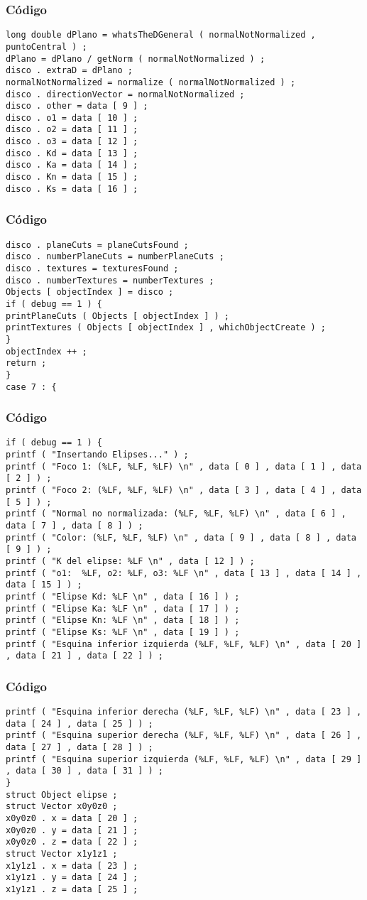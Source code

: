 \documentclass{beamer}
\begin{document}
\begin{frame}[fragile]
\frametitle{C\'odigo}
\begin{verbatim}
long double dPlano = whatsTheDGeneral ( normalNotNormalized , puntoCentral ) ; 
dPlano = dPlano / getNorm ( normalNotNormalized ) ; 
disco . extraD = dPlano ; 
normalNotNormalized = normalize ( normalNotNormalized ) ; 
disco . directionVector = normalNotNormalized ; 
disco . other = data [ 9 ] ; 
disco . o1 = data [ 10 ] ; 
disco . o2 = data [ 11 ] ; 
disco . o3 = data [ 12 ] ; 
disco . Kd = data [ 13 ] ; 
disco . Ka = data [ 14 ] ; 
disco . Kn = data [ 15 ] ; 
disco . Ks = data [ 16 ] ; 
\end{verbatim}
\end{frame}
\begin{frame}[fragile]
\frametitle{C\'odigo}
\begin{verbatim}
disco . planeCuts = planeCutsFound ; 
disco . numberPlaneCuts = numberPlaneCuts ; 
disco . textures = texturesFound ; 
disco . numberTextures = numberTextures ; 
Objects [ objectIndex ] = disco ; 
if ( debug == 1 ) { 
printPlaneCuts ( Objects [ objectIndex ] ) ; 
printTextures ( Objects [ objectIndex ] , whichObjectCreate ) ; 
} 
objectIndex ++ ; 
return ; 
} 
case 7 : { 
\end{verbatim}
\end{frame}
\begin{frame}[fragile]
\frametitle{C\'odigo}
\begin{verbatim}
if ( debug == 1 ) { 
printf ( "Insertando Elipses..." ) ; 
printf ( "Foco 1: (%LF, %LF, %LF) \n" , data [ 0 ] , data [ 1 ] , data [ 2 ] ) ; 
printf ( "Foco 2: (%LF, %LF, %LF) \n" , data [ 3 ] , data [ 4 ] , data [ 5 ] ) ; 
printf ( "Normal no normalizada: (%LF, %LF, %LF) \n" , data [ 6 ] , data [ 7 ] , data [ 8 ] ) ; 
printf ( "Color: (%LF, %LF, %LF) \n" , data [ 9 ] , data [ 8 ] , data [ 9 ] ) ; 
printf ( "K del elipse: %LF \n" , data [ 12 ] ) ; 
printf ( "o1:  %LF, o2: %LF, o3: %LF \n" , data [ 13 ] , data [ 14 ] , data [ 15 ] ) ; 
printf ( "Elipse Kd: %LF \n" , data [ 16 ] ) ; 
printf ( "Elipse Ka: %LF \n" , data [ 17 ] ) ; 
printf ( "Elipse Kn: %LF \n" , data [ 18 ] ) ; 
printf ( "Elipse Ks: %LF \n" , data [ 19 ] ) ; 
printf ( "Esquina inferior izquierda (%LF, %LF, %LF) \n" , data [ 20 ] , data [ 21 ] , data [ 22 ] ) ; 
\end{verbatim}
\end{frame}
\begin{frame}[fragile]
\frametitle{C\'odigo}
\begin{verbatim}
printf ( "Esquina inferior derecha (%LF, %LF, %LF) \n" , data [ 23 ] , data [ 24 ] , data [ 25 ] ) ; 
printf ( "Esquina superior derecha (%LF, %LF, %LF) \n" , data [ 26 ] , data [ 27 ] , data [ 28 ] ) ; 
printf ( "Esquina superior izquierda (%LF, %LF, %LF) \n" , data [ 29 ] , data [ 30 ] , data [ 31 ] ) ; 
} 
struct Object elipse ; 
struct Vector x0y0z0 ; 
x0y0z0 . x = data [ 20 ] ; 
x0y0z0 . y = data [ 21 ] ; 
x0y0z0 . z = data [ 22 ] ; 
struct Vector x1y1z1 ; 
x1y1z1 . x = data [ 23 ] ; 
x1y1z1 . y = data [ 24 ] ; 
x1y1z1 . z = data [ 25 ] ; 
\end{verbatim}
\end{frame}
\end{document}

